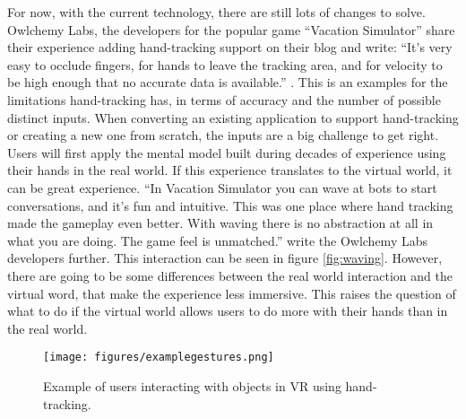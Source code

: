 For now, with the current technology, there are still lots of changes to solve. Owlchemy Labs, the developers for the popular game ``Vacation Simulator'' share their experience adding hand-tracking support on their blog and write: ``It’s very easy to occlude fingers, for hands to leave the tracking area, and for velocity to be high enough that no accurate data is available.'' \cite{VacSimBlog}. This is an examples for the limitations hand-tracking has, in terms of accuracy and the number of possible distinct inputs. When converting an existing application to support hand-tracking or creating a new one from scratch, the inputs are a big challenge to get right. Users will first apply the mental model built during decades of experience using their hands in the real world. If this experience translates to the virtual world, it can be great experience. ``In Vacation Simulator you can wave at bots to start conversations, and it’s fun and intuitive. This was one place where hand tracking made the gameplay even better. With waving there is no abstraction at all in what you are doing. The game feel is unmatched.'' write the Owlchemy Labs developers further. This interaction can be seen in figure \ref{fig:waving}. However, there are going to be some differences between the real world interaction and the virtual word, that make the experience less immersive. This raises the question of what to do if the virtual world allows users to do more with their hands than in the real world. 

\begin{figure}[!h]
    \centering
    \texttt{[image: figures/examplegestures.png]}
    \caption{Example of users interacting with objects in VR using hand-tracking. \cite{Han}}
    \label{fig:example}
\end{figure}

